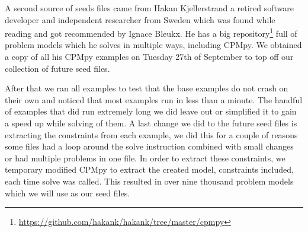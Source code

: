 A second source of seeds files came from Hakan Kjellerstrand a retired software developer and independent researcher from Sweden which was found while reading \cite{18bleukx2022model} and got recommended by Ignace Bleukx. He has a big repository\footnote{\url{https://github.com/hakank/hakank/tree/master/cpmpy}} full of problem models which he solves in multiple ways, including CPMpy. We obtained a copy of all his CPMpy examples on Tuesday 27th of September to top off our collection of future seed files.


After that we ran all examples to test that the base examples do not crash on their own and noticed that most examples run in less than a minute. The handful of examples that did run extremely long we did leave out or simplified it to gain a speed up while solving of them. A last change we did to the future seed files is extracting the constraints from each example, we did this for a couple of reasons some files had a loop around the solve instruction combined with small changes or had multiple problems in one file. In order to extract these constraints, we temporary modified CPMpy to extract the created model, constraints included, each time solve was called. This resulted in over nine thousand problem models which we will use as our seed files.



